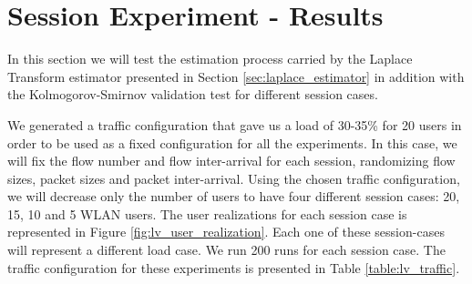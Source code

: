 \newpage
\section{Session Experiment - Results} \label{sec:lv_session_results}
In this section we will test the estimation process carried by the Laplace Transform estimator presented in Section \ref{sec:laplace_estimator} in addition with the Kolmogorov-Smirnov validation test for different session cases.

We generated a traffic configuration that gave us a load of 30-35\% for 20 users in order to be used as a fixed configuration for all the experiments. In this case, we will fix the flow number and flow inter-arrival for each session, randomizing flow sizes, packet sizes and packet inter-arrival. Using the chosen traffic configuration, we will decrease only the number of users to have four different session cases: 20, 15, 10 and 5 \acs{WLAN} users. The user realizations for each session case is represented in Figure \ref{fig:lv_user_realization}. Each one of these session-cases will represent a different load case. We run 200 runs for each session case. The traffic configuration for these experiments is presented in Table \ref{table:lv_traffic}.

